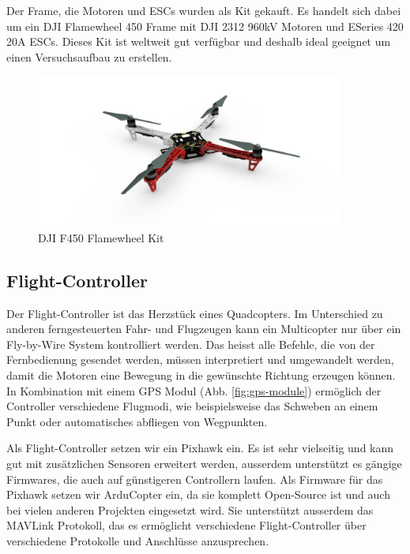 Der Frame, die Motoren und ESCs wurden als Kit gekauft. Es handelt sich dabei um ein DJI Flamewheel 450 Frame mit DJI 2312 960kV Motoren und ESeries 420 20A ESCs. Dieses Kit ist weltweit gut verfügbar und deshalb ideal geeignet um einen Versuchsaufbau zu erstellen.

\begin{figure}[h]
\centering
\includegraphics[width=0.9\textwidth] {images/hardware/f450.jpg} 
\caption{DJI F450 Flamewheel Kit}
\label{fig:f450}
\end{figure}


\subsection{Flight-Controller}

Der Flight-Controller ist das Herzstück eines Quadcopters. Im Unterschied zu anderen ferngesteuerten Fahr- und Flugzeugen kann ein Multicopter nur über ein Fly-by-Wire System kontrolliert werden. Das heisst alle Befehle, die von der Fernbedienung gesendet werden, müssen interpretiert und umgewandelt werden, damit die Motoren eine Bewegung in die gewünschte Richtung erzeugen können. In Kombination mit einem GPS Modul (Abb. \ref{fig:gps-module}) ermöglich der Controller verschiedene Flugmodi, wie beispielsweise das Schweben an einem Punkt oder automatisches abfliegen von Wegpunkten.

Als Flight-Controller setzen wir ein Pixhawk ein. Es ist sehr vielseitig und kann gut mit zusätzlichen Sensoren erweitert werden, ausserdem unterstützt es gängige Firmwares, die auch auf günstigeren Controllern laufen. Als Firmware für das Pixhawk setzen wir ArduCopter ein, da sie komplett Open-Source ist und auch bei vielen anderen Projekten eingesetzt wird. Sie unterstützt ausserdem das \Gls{MAVLink} Protokoll, das es ermöglicht verschiedene Flight-Controller über verschiedene Protokolle und Anschlüsse anzusprechen.

